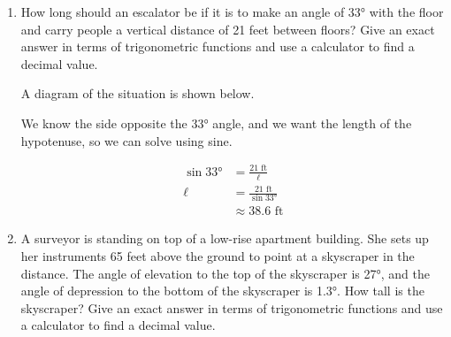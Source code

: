 \documentclass{article}
\begin{document}
\begin{enumerate}
\newpage

\item
\begin{problem}
    How long should an escalator be if it is to make an angle of \ang{33} with the floor and carry people a vertical distance of 21 feet between floors? Give an exact answer in terms of trigonometric functions and use a calculator to find a decimal value.
\end{problem}

\begin{solution}
A diagram of the situation is shown below.


We know the side opposite the \ang{33} angle, and we want the length of the hypotenuse, so we can solve using sine.

\begin{align*}
    \sin \ang{33} &= \frac{21\text{ ft}}{\ell} \\
    \ell &= \frac{21 \text{ ft}}{\sin \ang{33}} \\
    & \approx 38.6 \text{ ft}
\end{align*}
\end{solution}


\item
\begin{problem}
    A surveyor is standing on top of a low-rise apartment building. She sets up her instruments 65 feet above the ground to point at a skyscraper in the distance. The angle of elevation to the top of the skyscraper is \ang{27}, and the angle of depression to the bottom of the skyscraper is \ang{1.3}. How tall is the skyscraper? Give an exact answer in terms of trigonometric functions and use a calculator to find a decimal value.
\end{problem}


\end{enumerate}
\end{document}
